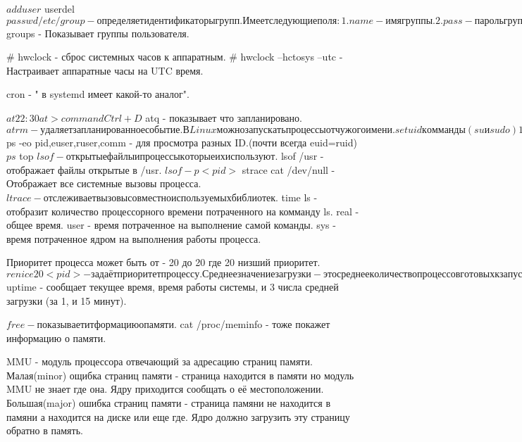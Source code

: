 $ adduser
$ userdel
$ passwd

/etc/group - определяет идентификаторы групп. Имеет следующие поля:
1. name - имя группы.
2. pass - пароль группы.
3. GID  - ID группы.
4. user - участники группы в дополнение тем которые указаны в /etc/password

$ groups - Показывает группы пользователя.


# hwclock - сброс системных часов к аппаратным.
# hwclock --hctosys --utc - Настраивает аппаратные часы на UTC время.

cron - " в systemd имеет какой-то аналог".

$ at 22:30
at> command
Ctrl+D
$ atq - показывает что запланировано.
$ atrm - удаляет запланированное событие.

В Linux можно запускать процессы от чужого имени. setuid комманды (su и sudo)
1. euid - эфективный ID. (исполнитель)
2. ruid - реальный ID.   (владелец)
3. suid - сохраненный ID.
4. fsuid - ID пользователя файловой системой.

$ ps -eo pid,euser,ruser,comm - для просмотра разных ID.(почти всегда euid=ruid)
$ ps
$ top 
$ lsof - открытые файлы и процессы которые их используют.
$ lsof /usr - отображает файлы открытые в /usr.
$ lsof -p <pid>
$ strace cat /dev/null - Отображает все системные вызовы процесса.
$ ltrace - отслеживает вызовы совместно используемых библиотек.
$ time ls - отобразит количество процессорного времени потраченного на комманду ls.
real - общее время.
user - время потраченное на выполнение самой команды.
sys  - время потраченное ядром на выполнения работы процесса.

Приоритет процесса может быть от - 20 до 20 где 20 низший приоритет.
$ renice 20 <pid> - задаёт приоритет процессу.
Среднее значение загрузки - это среднее количество процессов готовых к запуску 
                            (на исполнение для процесора).
$ uptime - сообщает текущее время, время работы системы, и 3 числа средней
загрузки (за 1, и 15 минут).

$ free - показывает итформацию о памяти.
$ cat /proc/meminfo - тоже покажет информацию о памяти.

MMU - модуль процессора отвечающий за адресацию страниц памяти.
    Малая(minor) ощибка страниц памяти - страница находится в памяти но модуль 
MMU не знает где она. Ядру приходится сообщать о её местоположении.
    Большая(major) ошибка страниц памяти - страница памяни не находится в памяни 
а находится на диске или еще где. Ядро должно загрузить эту страницу обратно в
память.

